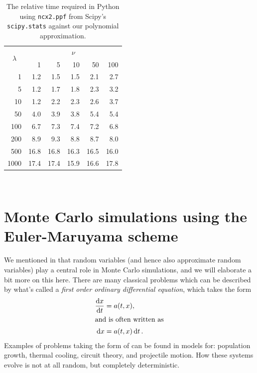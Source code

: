 \documentclass[11pt,a4paper,twoside,english]{extarticle}
\begin{document}
\begin{table}[htb]
\centering    
\begin{tabular}{|r|rrrrr|}
\multicolumn{1}{c}{\multirow{2}{*}{$ \lambda $}} & \multicolumn{5}{c}{$ \nu $} \\
\cline{2-6}
\multicolumn{1}{c|}{} & 1 &   5  &  10 &  50  & 100 \\
\hline
   1 &  1.2 &  1.5 &  1.5 &  2.1 &  2.7 \\
   5 &  1.2 &  1.7 &  1.8 &  2.3 &  3.2 \\
  10 &  1.2 &  2.2 &  2.3 &  2.6 &  3.7 \\
  50 &  4.0 &  3.9 &  3.8 &  5.4 &  5.4 \\
 100 &  6.7 &  7.3 &  7.4 &  7.2 &  6.8 \\
 200 &  8.9 &  9.3 &  8.8 &  8.7 &  8.0 \\
 500 & 16.8 & 16.8 & 16.3 & 16.5 & 16.0 \\
1000 & 17.4 & 17.4 & 15.9 & 16.6 & 17.8 \\
\hline 
\end{tabular}\\[1em]
\caption{The relative time required in Python using \texttt{ncx2.ppf} from Scipy's \texttt{scipy.stats} against our polynomial approximation.}
\label{tab:non_central_chi_2_times_python_approximation}
\end{table}





\clearpage
\section{Monte Carlo simulations using the Euler-Maruyama scheme}

We mentioned in  that random variables (and hence also approximate random variables) play a central role in Monte Carlo simulations, and we will elaborate a bit more on this here. There are many classical problems which can be described by what's called a \emph{first order ordinary differential equation}, which takes the form 
\begin{align}
\dv{x}{t} & = a(t, x), \\
\shortintertext{and is often written as}
\dd{x} & = a(t, x) \dd{t}. \label{eqt:first_order_ode}
\end{align}
Examples of problems taking the form of  can be found in models for: population growth, thermal cooling, circuit theory, and projectile motion. How these systems evolve is not at all random, but completely deterministic. 
\end{document}
